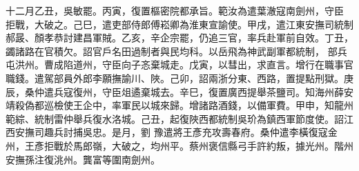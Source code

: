 \begin{pinyinscope}
十二月乙丑，吳敏罷。丙寅，復置樞密院都承旨。範汝為遣葉澈寇南劍州，守臣
 拒戰，大破之。己巳，遣吏部侍郎傅崧卿為淮東宣諭使。甲戌，遣江東安撫司統制郝晸、顏孝恭討建昌軍賊。乙亥，辛企宗罷，仍追三官，率兵赴軍前自效。丁丑，蠲諸路在官積欠。詔官戶名田過制者與民均科。以岳飛為神武副軍都統制，
 部兵屯洪州。曹成陷道州，守臣向子忞棄城走。戊寅，以彗出，求直言。增行在職事官職錢。遣駕部員外郎李願撫諭川、陜。己卯，詔兩浙分東、西路，置提點刑獄。庚辰，桑仲遣兵寇復州，守臣俎遹棄城去。辛巳，復置廣西提舉茶鹽司。知海州薛安靖殺偽都巡檢使王企中，率軍民以城來歸。增諸路酒錢，以備軍費。甲申，知龍州範綜、統制雷仲舉兵復水洛城。己丑，起復陜西都統制吳玠為鎮西軍節度使。詔江西安撫司趣兵討捕吳忠。是月，劉
 豫遣將王彥充攻壽春府。桑仲遣李橫復寇金州，王彥拒戰於馬郎嶺，大破之，均州平。蔡州褒信縣弓手許約叛，據光州。階州安撫孫注復洮州。龔富等圍南劍州。



\end{pinyinscope}